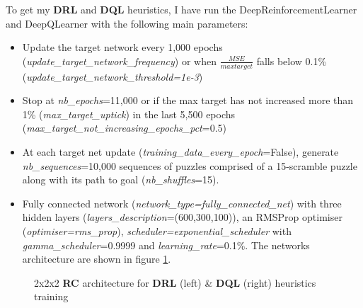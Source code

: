 \label{sec:S33DRL}
To get my \textbf{DRL} and \textbf{DQL} heuristics, I have run the DeepReinforcementLearner and DeepQLearner with the following main parameters:
\begin{itemize}
\item Update the target network every 1,000 epochs (\textit{update\_target\_network\_frequency}) or when $\frac{MSE}{max target}$ falls below 0.1\% (\textit{update\_target\_network\_threshold=1e-3})
\item Stop at \textit{nb\_epochs}=11,000 or if the max target has not increased more than 1\% (\textit{max\_target\_uptick}) in the last 5,500 epochs (\textit{max\_target\_not\_increasing\_epochs\_pct}=0.5)
\item At each target net update (\textit{training\_data\_every\_epoch}=False), generate \textit{nb\_sequences}=10,000 sequences of puzzles comprised of a 15-scramble puzzle along with its path to goal (\textit{nb\_shuffles}=15).
\item Fully connected network (\textit{network\_type=fully\_connected\_net}) with three hidden layers (\textit{layers\_description}=(600,300,100)), an RMSProp optimiser (\textit{optimiser=rms\_prop}), \textit{scheduler=exponential\_scheduler} with \textit{gamma\_scheduler}=0.9999 and \textit{learning\_rate}=0.1\%. The networks architecture are shown in figure \ref{fig:222RCnets}.
\end{itemize}



\begin{figure}[H]
  \noindent
  \caption[222RCnets]{2x2x2 \textbf{RC} architecture for \textbf{DRL} (left) \& \textbf{DQL} (right) heuristics training}
  \label{fig:222RCnets}
\end{figure}


